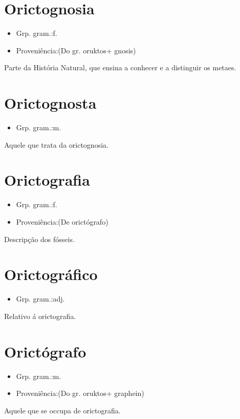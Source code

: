 \section{Orictognosia}
\begin{itemize}
\item {Grp. gram.:f.}
\end{itemize}
\begin{itemize}
\item {Proveniência:(Do gr. \textunderscore oruktos\textunderscore  + \textunderscore gnosis\textunderscore )}
\end{itemize}
Parte da História Natural, que ensina a conhecer e a distinguir os metaes.
\section{Orictognosta}
\begin{itemize}
\item {Grp. gram.:m.}
\end{itemize}
Aquele que trata da orictognosia.
\section{Orictografia}
\begin{itemize}
\item {Grp. gram.:f.}
\end{itemize}
\begin{itemize}
\item {Proveniência:(De \textunderscore orictógrafo\textunderscore )}
\end{itemize}
Descripção dos fósseis.
\section{Orictográfico}
\begin{itemize}
\item {Grp. gram.:adj.}
\end{itemize}
Relativo á orictografia.
\section{Orictógrafo}
\begin{itemize}
\item {Grp. gram.:m.}
\end{itemize}
\begin{itemize}
\item {Proveniência:(Do gr. \textunderscore oruktos\textunderscore  + \textunderscore graphein\textunderscore )}
\end{itemize}
Aquele que se occupa de orictografia.
